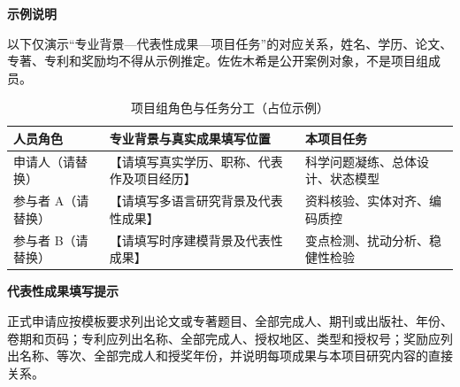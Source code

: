 \GXNSFBodyText

\noindent\textbf{示例说明}\par
以下仅演示“专业背景—代表性成果—项目任务”的对应关系，姓名、学历、论文、专著、专利和奖励均不得从示例推定。佐佐木希是公开案例对象，不是项目组成员。

\begin{table}[htbp]
  \centering
  \fontsize{10}{14}\selectfont
  \caption{项目组角色与任务分工（占位示例）}
  \begin{tabularx}{\textwidth}{p{}X X}
    \toprule
    人员角色 & 专业背景与真实成果填写位置 & 本项目任务 \\
    \midrule
    申请人（请替换） & 【请填写真实学历、职称、代表作及项目经历】 & 科学问题凝练、总体设计、状态模型 \\
    参与者 A（请替换） & 【请填写多语言研究背景及代表性成果】 & 资料核验、实体对齐、编码质控 \\
    参与者 B（请替换） & 【请填写时序建模背景及代表性成果】 & 变点检测、扰动分析、稳健性检验 \\
    \bottomrule
  \end{tabularx}
  \label{tab:gx-team-role}
\end{table}

\noindent\textbf{代表性成果填写提示}\par
正式申请应按模板要求列出论文或专著题目、全部完成人、期刊或出版社、年份、卷期和页码；专利应列出名称、全部完成人、授权地区、类型和授权号；奖励应列出名称、等次、全部完成人和授奖年份，并说明每项成果与本项目研究内容的直接关系。
